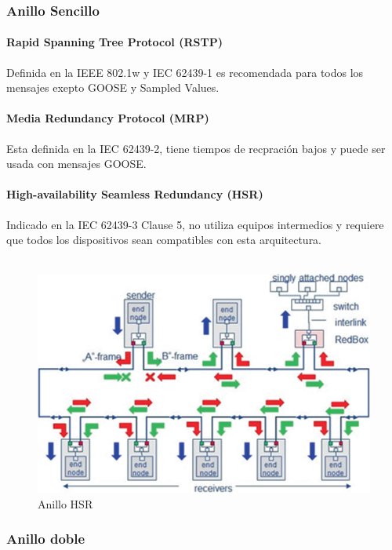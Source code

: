\documentclass[a5paper]{book}%
\begin{document}
\subsubsection{Anillo Sencillo}


\paragraph{Rapid Spanning Tree Protocol (RSTP)}

Definida en la IEEE 802.1w y IEC 62439-1 es recomendada para todos los mensajes exepto GOOSE  y Sampled Values.


\paragraph{Media Redundancy Protocol (MRP)}

Esta definida en la IEC 62439-2,  tiene tiempos de recpración bajos y puede ser usada con mensajes GOOSE.

\paragraph{High-availability Seamless Redundancy (HSR)}

Indicado en la IEC 62439-3 Clause 5,  no utiliza equipos intermedios y requiere que todos los dispositivos sean compatibles con esta arquitectura.\\\\ 

\begin{figure}[h]
	\centering
	\caption{Anillo HSR}
	\label{fig:hsr}
	\includegraphics[width=0.7\linewidth]{hsr}
\end{figure}

\subsubsection{Anillo doble}
\end{document}
